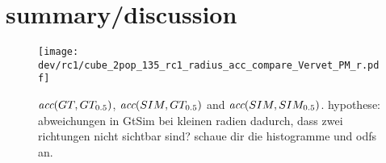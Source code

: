 \section{summary/discussion}
% 
%  
% 
\begin{figure}[!p]
\centering
\texttt{[image: dev/rc1/cube\_2pop\_135\_rc1\_radius\_acc\_compare\_Vervet\_PM\_r.pdf]}
\caption[sim acc]{ $\textit{acc}{}(GT,GT_{0.5})$, $\textit{acc}{}(SIM,GT_{0.5})$ and $\textit{acc}{}(SIM,SIM_{0.5})$. hypothese: abweichungen in GtSim bei kleinen radien dadurch, dass zwei richtungen nicht sichtbar sind? schaue dir die histogramme und odfs an. }
\label{fig:accVervetPMr}
\end{figure}
% 
